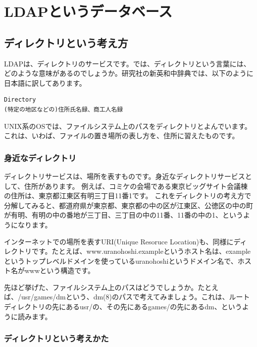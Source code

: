 \chapter{LDAPというデータベース}

\section{ディレクトリという考え方}

LDAPは、ディレクトリのサービスです。では、ディレクトリという言葉には、どのような意味があるのでしょうか。研究社の新英和中辞典では、以下のように日本語に訳してあります。

\begin{verbatim}
Directory
(特定の地区などの)住所氏名録、商工人名録
\end{verbatim}

UNIX系のOSでは、ファイルシステム上のパスをディレクトリとよんでいます。これは、いわば、ファイルの置き場所の表し方を、住所に習えたものです。

\subsection{身近なディレクトリ}

ディレクトリサービスは、場所を表すものです。身近なディレクトリサービスとして、住所があります。
例えば、コミケの会場である東京ビッグサイト会議棟の住所は、東京都江東区有明三丁目11番1です。
これをディレクトリの考え方で分解してみると、都道府県が東京都、東京都の中の区が江東区、公徳区の中の町が有明、有明の中の番地が三丁目、三丁目の中の11番、11番の中の1、というようになります。

インターネットでの場所を表すURI(Unique Resoruce Location)も、同様にディレクトリです。たとえば、www.uranohoshi.exampleというホスト名は、exampleというトップレベルドメインを使っているuranohoshiというドメイン名で、ホスト名がwwwという構造です。

先ほど挙げた、ファイルシステム上のパスはどうでしょうか。たとえば、/usr/games/dmという、dm(8)のパスで考えてみましょう。これは、ルートディレクトリの先にあるusr/の、その先にあるgames/の先にあるdm、というように読みます。

\subsection{ディレクトリという考えかた}

